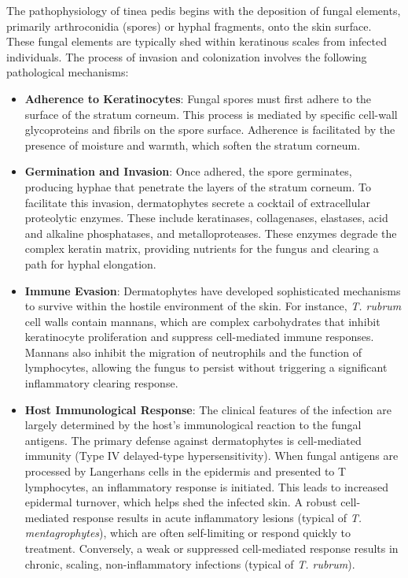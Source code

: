 The pathophysiology of tinea pedis begins with the deposition of fungal elements, primarily arthroconidia (spores) or hyphal fragments, onto the skin surface. These fungal elements are typically shed within keratinous scales from infected individuals. The process of invasion and colonization involves the following pathological mechanisms:
\begin{itemize}
    \item \textbf{Adherence to Keratinocytes}: Fungal spores must first adhere to the surface of the stratum corneum. This process is mediated by specific cell-wall glycoproteins and fibrils on the spore surface. Adherence is facilitated by the presence of moisture and warmth, which soften the stratum corneum.
    \item \textbf{Germination and Invasion}: Once adhered, the spore germinates, producing hyphae that penetrate the layers of the stratum corneum. To facilitate this invasion, dermatophytes secrete a cocktail of extracellular proteolytic enzymes. These include keratinases, collagenases, elastases, acid and alkaline phosphatases, and metalloproteases. These enzymes degrade the complex keratin matrix, providing nutrients for the fungus and clearing a path for hyphal elongation.
    \item \textbf{Immune Evasion}: Dermatophytes have developed sophisticated mechanisms to survive within the hostile environment of the skin. For instance, \textit{T. rubrum} cell walls contain mannans, which are complex carbohydrates that inhibit keratinocyte proliferation and suppress cell-mediated immune responses. Mannans also inhibit the migration of neutrophils and the function of lymphocytes, allowing the fungus to persist without triggering a significant inflammatory clearing response.
    \item \textbf{Host Immunological Response}: The clinical features of the infection are largely determined by the host's immunological reaction to the fungal antigens. The primary defense against dermatophytes is cell-mediated immunity (Type IV delayed-type hypersensitivity). When fungal antigens are processed by Langerhans cells in the epidermis and presented to T lymphocytes, an inflammatory response is initiated. This leads to increased epidermal turnover, which helps shed the infected skin. A robust cell-mediated response results in acute inflammatory lesions (typical of \textit{T. mentagrophytes}), which are often self-limiting or respond quickly to treatment. Conversely, a weak or suppressed cell-mediated response results in chronic, scaling, non-inflammatory infections (typical of \textit{T. rubrum}).
\end{itemize}

